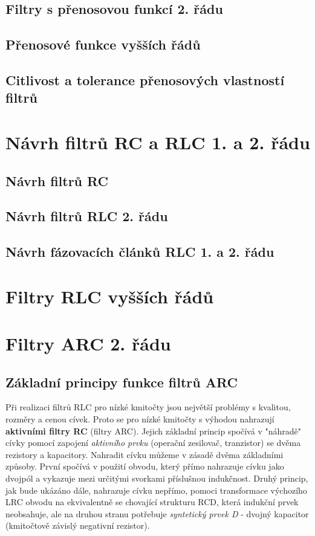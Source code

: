    \subsection{Filtry s přenosovou funkcí 2. řádu}
    \subsection{Přenosové funkce vyšších řádů}
    \subsection{Citlivost a tolerance přenosových vlastností filtrů} 
  \section{Návrh filtrů RC a RLC 1. a 2. řádu}
    \subsection{Návrh filtrů RC}
    \subsection{Návrh filtrů RLC 2. řádu}
    \subsection{Návrh fázovacích článků RLC 1. a 2. řádu}     
  \section{Filtry RLC vyšších řádů}
    
  \section{Filtry ARC 2. řádu}
    \subsection{Základní principy funkce filtrů ARC}
      Při realizaci filtrů RLC pro nízké kmitočty jsou největší problémy s kvalitou, rozměry a
      cenou cívek. Proto se pro nízké kmitočty s výhodou nahrazují \textbf{aktivními filtry RC}
      (filtry ARC). Jejich základní princip spočívá v "náhradě" cívky pomocí zapojení
      \emph{aktivního prvku} (operační zesilovač, tranzistor) se dvěma rezistory a kapacitory.
      Nahradit cívku můžeme v zásadě dvěma základními způsoby. První spočívá v použití obvodu,
      který přímo nahrazuje cívku jako dvojpól a vykazuje mezi určitými svorkami příslušnou
      indukčnost. Druhý princip, jak bude ukázáno dále, nahrazuje cívku nepřímo, pomoci
      transformace výchozího LRC obvodu na ekvivalentně se chovající strukturu RCD, která indukční
      prvek neobsahuje, ale na druhou stranu potřebuje \emph{syntetický prvek D} - dvojný kapacitor
      (kmitočtově závislý negativní rezistor).

